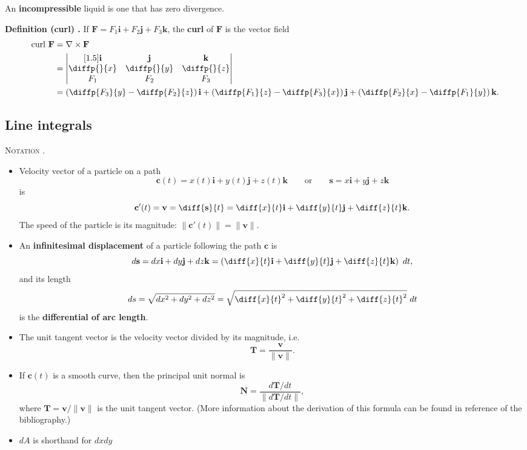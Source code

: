 An \textbf{incompressible} liquid is one that has zero divergence.

\begin{shaded}
\textbf{Definition (curl) \cite{math2111_notes}.} If $\mathbf{F} = F_1 \mathbf{i} + F_2 \mathbf{j} + F_3 \mathbf{k}$, the \textbf{curl} of $\mathbf{F}$ is the vector field
\begin{align*}
\text{curl} \ \mathbf{F} &= \nabla \times \mathbf{F} \\
&= \begin{vmatrix}[1.5]
	\mathbf{i} & \mathbf{j} & \mathbf{k} \\
	\diffp{}{x} & \diffp{}{y} & \diffp{}{z} \\
	F_1 & F_2 & F_3
\end{vmatrix} \\
&= \left( \diffp{F_3}{y} - \diffp{F_2}{z} \right) \mathbf{i} + \left( \diffp{F_1}{z} - \diffp{F_3}{x} \right) \mathbf{j} + \left( \diffp{F_2}{x} - \diffp{F_1}{y} \right) \mathbf{k} .
\end{align*}
\end{shaded}

\subsection{Line integrals}

\textsc{Notation \cite{marsden_vector_calculus} \cite{thomas_calculus}.}
\begin{itemize}
	\item Velocity vector of a particle on a path
	$$\mathbf{c}(t) = x(t) \mathbf{i} + y(t) \mathbf{j} + z(t) \mathbf{k} \qquad \text{or} \qquad \mathbf{s} = x \mathbf{i} + y \mathbf{j} + z \mathbf{k} $$
is
$$ \mathbf{c}'(t) = \mathbf{v} = \diff{\mathbf{s}}{t} = \diff{x}{t} \mathbf{i} + \diff{y}{t} \mathbf{j} + \diff{z}{t} \mathbf{k} . $$
The speed of the particle is its magnitude: $\lVert \mathbf{c}'(t) \rVert = \lVert \mathbf{v} \rVert$.
	\item An \textbf{infinitesimal displacement} of a particle following the path $\mathbf{c}$ is
$$ d \mathbf{s} = dx \mathbf{i} + dy \mathbf{j} + dz \mathbf{k} = \left( \diff{x}{t} \mathbf{i} + \diff{y}{t} \mathbf{j} + \diff{z}{t} \mathbf{k} \right) \ dt , $$
and its length
$$ ds = \sqrt{dx^2 + dy^2 + dz^2} = \sqrt{{\diff{x}{t}}^2 + {\diff{y}{t}}^2 + {\diff{z}{t}}^2} \ dt $$
is the \textbf{differential of arc length}.
	\item The unit tangent vector is the velocity vector divided by its magnitude, i.e.
$$ \mathbf{T} = \frac{\mathbf{v}}{\lVert \mathbf{v} \rVert} . $$
	\item If $\mathbf{c}(t)$ is a smooth curve, then the principal unit normal is
$$ \mathbf{N} = \frac{d\mathbf{T} / dt}{\lVert d\mathbf{T} / dt \rVert} , $$
where $\mathbf{T} = \mathbf{v} / \lVert \mathbf{v} \rVert$ is the unit tangent vector. (More information about the derivation of this formula can be found in reference \cite{thomas_calculus} of the bibliography.)
	\item $dA$ is shorthand for $dx dy$
\end{itemize}

